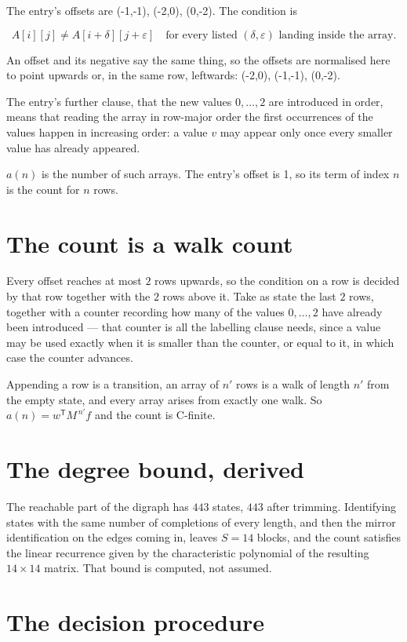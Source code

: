 \documentclass[11pt]{article}
\theoremstyle{definition}
\begin{document}
The entry's offsets are (-1,-1), (-2,0), (0,-2). The condition is

\[A[i][j] \ne A[i{+}\delta][j{+}\varepsilon]\quad\text{for every listed }(\delta,\varepsilon)\text{ landing inside the array.}\]

An offset and its negative say the same thing, so the offsets are normalised here to point upwards or, in the same row, leftwards: (-2,0), (-1,-1), (0,-2).

The entry's further clause, that the new values $0,\dots,2$ are introduced in order, means that reading the array in row-major order the first occurrences of the values happen in increasing order: a value $v$ may appear only once every smaller value has already appeared.

$a(n)$ is the number of such arrays. The entry's offset is 1, so its term of index $n$ is the count for $n$ rows.

\section{The count is a walk count}

Every offset reaches at most $2$ rows upwards, so the condition on a row is decided by that row together with the $2$ rows above it. Take as state the last $2$ rows, together with a counter recording how many of the values $0,\dots,2$ have already been introduced --- that counter is all the labelling clause needs, since a value may be used exactly when it is smaller than the counter, or equal to it, in which case the counter advances.

Appending a row is a transition, an array of $n'$ rows is a walk of length $n'$ from the empty state, and every array arises from exactly one walk. So $a(n) = w^{\mathsf T}M^{\,n'}f$ and the count is C-finite.

\section{The degree bound, derived}

The reachable part of the digraph has $443$ states, $443$ after trimming. Identifying states with the same number of completions of every length, and then the mirror identification on the edges coming in, leaves $S = 14$ blocks, and the count satisfies the linear recurrence given by the characteristic polynomial of the resulting $14\times14$ matrix. That bound is computed, not assumed.

\section{The decision procedure}
\end{document}
